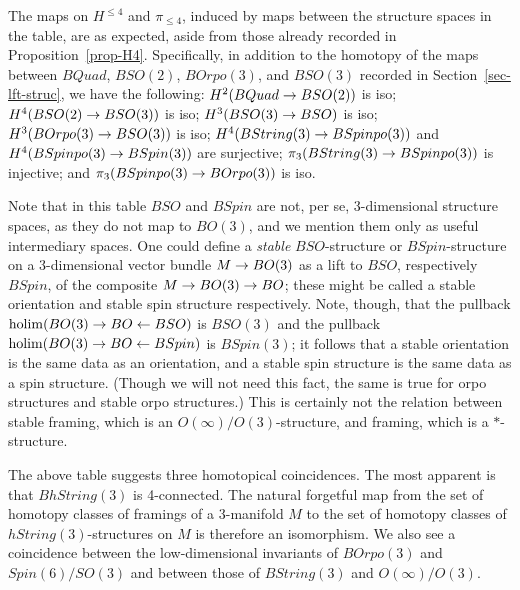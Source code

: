 \documentclass{amsart}
\begin{document}
The maps on $H^{\leq 4}$ and $\pi_{\leq 4}$, induced by maps between the structure spaces in the table, are as expected, aside from those already recorded in Proposition~\ref{prop-H4}.  Specifically, in addition to the homotopy of the maps between $BQuad$, $BSO(2)$, $BOrpo(3)$, and $BSO(3)$ recorded in Section~\ref{sec-lft-struc}, we have the following: $H^2(BQuad \rightarrow BSO(2))$ is iso; $H^4(BSO(2) \rightarrow BSO(3))$ is iso; $H^3(BSO(3) \rightarrow BSO)$ is iso; $H^3(BOrpo(3) \rightarrow BSO(3))$ is iso; $H^4(BString(3) \rightarrow BSpinpo(3))$ and $H^4(BSpinpo(3) \rightarrow BSpin(3))$ are surjective; $\pi_3(BString(3) \rightarrow BSpinpo(3))$ is injective; and $\pi_3(BSpinpo(3) \rightarrow BOrpo(3))$ is iso. %

Note that in this table $BSO$ and $BSpin$ are not, per se, 3-dimensional structure spaces, as they do not map to $BO(3)$, and we mention them only as useful intermediary spaces.  One could define a \emph{stable} $BSO$-structure or $BSpin$-structure on a 3-dimensional vector bundle $M \rightarrow BO(3)$ as a lift to $BSO$, respectively $BSpin$, of the composite $M \rightarrow BO(3) \rightarrow BO$; these might be called a stable orientation and stable spin structure respectively.  Note, though, that the pullback $\operatorname{holim}(BO(3) \rightarrow BO \leftarrow BSO)$ is $BSO(3)$ and the pullback $\operatorname{holim}(BO(3) \rightarrow BO \leftarrow BSpin)$ is $BSpin(3)$; it follows that a stable orientation is the same data as an orientation, and a stable spin structure is the same data as a spin structure.  (Though we will not need this fact, the same is true for orpo structures and stable orpo structures.)  This is certainly not the relation between stable framing, which is an $O(\infty)/O(3)$-structure, and framing, which is a $*$-structure.

The above table suggests three homotopical coincidences.  The most apparent is that $BhString(3)$ is 4-connected.  The natural forgetful map from the set of homotopy classes of framings of a 3-manifold $M$ to the set of homotopy classes of $hString(3)$-structures on $M$ is therefore an isomorphism.  We also see a coincidence between the low-dimensional invariants of $BOrpo(3)$ and $Spin(6)/SO(3)$ and between those of $BString(3)$ and $O(\infty)/O(3)$.
\end{document}
